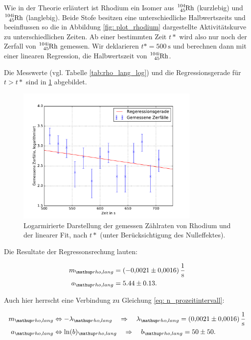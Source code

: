 Wie in der Theorie erläutert ist Rhodium ein Isomer aus $\ce{^{104}_{45} Rh}$ (kurzlebig) und
$\ce{^{104i}_{45} Rh}$ (langlebig). Beide Stofe besitzen eine unterschiedliche Halbwertszeits und
beeinflussen so die in Abbildung \ref{fig: plot_rhodium} dargestellte Aktivitätskurve zu unterschiedlichen
Zeiten.
Ab einer bestimmten Zeit $t*$ wird also nur noch der Zerfall von $\ce{^{104i}_{45} Rh}$
gemessen.
Wir deklarieren $t*=\SI{500}{\second}$ und berechnen dann mit einer linearen Regression,
die Halbwertszeit von $\ce{^{104i}_{45} Rh}$.

Die Messwerte (vgl. Tabelle \ref{tab:rho_lang_log}) und die Regressionsgerade für $t>t*$ sind in \ref{fig: plot_rhodium_lang} abgebildet.

\begin{figure}
  \centering
  \includegraphics[width=0.8\textwidth]{pics/rhodium_lang_miterror.pdf}
  \caption{Logarmirierte Darstellung der gemessen Zählraten von Rhodium und der linearer Fit, nach $t*$  (unter Berücksichtigung des Nulleffektes).}
  \label{fig: plot_rhodium_lang}
\end{figure}

Die Resultate der Regressonsrechung lauten:

\begin{align}
  \label{eq:parameter_rhodium_lang}
  \begin{aligned}
    m\ua{rho,lang}&=\SI{-0.0021\pm0.0016}{\per\second}\\
    a\ua{rho,lang}&=5.44\pm0.13.
  \end{aligned}
\end{align}


Auch hier herrscht eine Verbindung zu Gleichung \eqref{eq: n_prozeitintervall}:

\begin{align}
  \label{eq:parameter_rhodium_lang_lambda}
  \begin{aligned}
    m\ua{rho,lang}&\Leftrightarrow -\lambda\ua{rho,lang} \quad \Rightarrow \quad \lambda\ua{rho,lang}=\SI{0.0021\pm0.0016}{\per\second}\\
    a\ua{rho,lang}&\Leftrightarrow \ln(b)\ua{rho,lang} \quad \Rightarrow \quad b\ua{rho,lang} =50\pm 50.
  \end{aligned}
\end{align}

